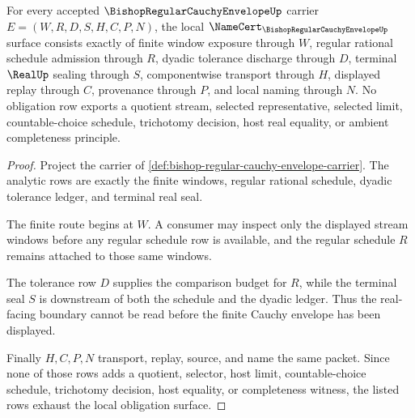 \begin{theorem}
\label{thm:bishop-regular-cauchy-envelope-obligation-surface}
For every accepted $\BishopRegularCauchyEnvelopeUp$ carrier $E=(W,R,D,S,H,C,P,N)$, the local $\NameCert_{\BishopRegularCauchyEnvelopeUp}$ surface consists exactly of finite window exposure through $W$, regular rational schedule admission through $R$, dyadic tolerance discharge through $D$, terminal $\RealUp$ sealing through $S$, componentwise transport through $H$, displayed replay through $C$, provenance through $P$, and local naming through $N$. No obligation row exports a quotient stream, selected representative, selected limit, countable-choice schedule, trichotomy decision, host real equality, or ambient completeness principle.
\end{theorem}
\begin{proof}
Project the carrier of \autoref{def:bishop-regular-cauchy-envelope-carrier}. The analytic rows are exactly the finite windows, regular rational schedule, dyadic tolerance ledger, and terminal real seal.

The finite route begins at $W$. A consumer may inspect only the displayed stream windows before any regular schedule row is available, and the regular schedule $R$ remains attached to those same windows.

The tolerance row $D$ supplies the comparison budget for $R$, while the terminal seal $S$ is downstream of both the schedule and the dyadic ledger. Thus the real-facing boundary cannot be read before the finite Cauchy envelope has been displayed.

Finally $H,C,P,N$ transport, replay, source, and name the same packet. Since none of those rows adds a quotient, selector, host limit, countable-choice schedule, trichotomy decision, host equality, or completeness witness, the listed rows exhaust the local obligation surface.
\end{proof}

